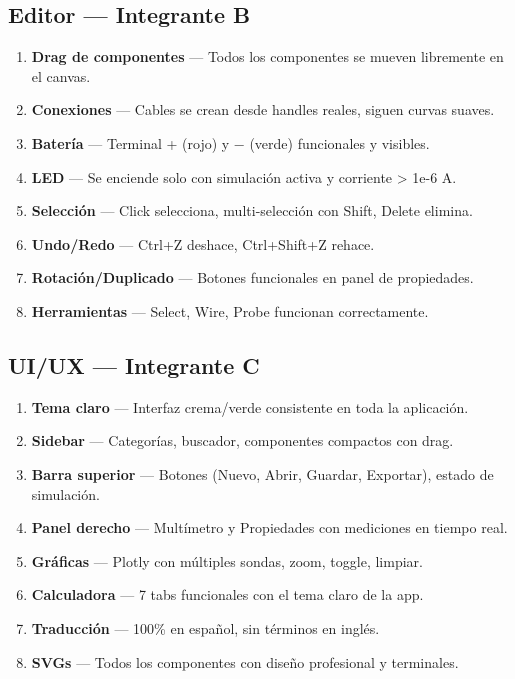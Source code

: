 \documentclass[12pt,a4paper]{article}
\begin{document}
\subsection*{Editor — Integrante B}
\begin{enumerate}[label=\textbf{B\arabic*}]
    \item \textbf{Drag de componentes} — Todos los componentes se mueven libremente en el canvas.
    \item \textbf{Conexiones} — Cables se crean desde handles reales, siguen curvas suaves.
    \item \textbf{Batería} — Terminal + (rojo) y − (verde) funcionales y visibles.
    \item \textbf{LED} — Se enciende solo con simulación activa y corriente > 1e-6 A.
    \item \textbf{Selección} — Click selecciona, multi-selección con Shift, Delete elimina.
    \item \textbf{Undo/Redo} — Ctrl+Z deshace, Ctrl+Shift+Z rehace.
    \item \textbf{Rotación/Duplicado} — Botones funcionales en panel de propiedades.
    \item \textbf{Herramientas} — Select, Wire, Probe funcionan correctamente.
\end{enumerate}

\subsection*{UI/UX — Integrante C}
\begin{enumerate}[label=\textbf{C\arabic*}]
    \item \textbf{Tema claro} — Interfaz crema/verde consistente en toda la aplicación.
    \item \textbf{Sidebar} — Categorías, buscador, componentes compactos con drag.
    \item \textbf{Barra superior} — Botones (Nuevo, Abrir, Guardar, Exportar), estado de simulación.
    \item \textbf{Panel derecho} — Multímetro y Propiedades con mediciones en tiempo real.
    \item \textbf{Gráficas} — Plotly con múltiples sondas, zoom, toggle, limpiar.
    \item \textbf{Calculadora} — 7 tabs funcionales con el tema claro de la app.
    \item \textbf{Traducción} — 100\% en español, sin términos en inglés.
    \item \textbf{SVGs} — Todos los componentes con diseño profesional y terminales.
\end{enumerate}
\end{document}
